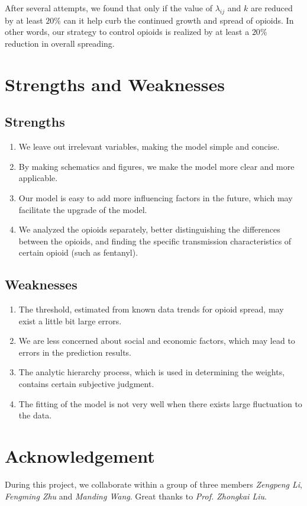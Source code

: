 \documentclass[12pt]{article}
\begin{document}
After several attempts, we found that only if the value of $\lambda_{ij}$ and $k$ are reduced by at least $20\%$ can it help curb the continued growth and spread of opioids. In other words, our strategy to control opioids is realized by at least a $20\%$ reduction in overall spreading.

\section{Strengths and Weaknesses}
\subsection{Strengths}
 \begin{enumerate}[\bfseries (1)]
    \item We leave out irrelevant variables, making the model simple and concise.
    \item By making schematics and figures, we make the model more clear and more applicable.
    \item Our model is easy to add more influencing factors in the future, which may facilitate the upgrade of the model.
    \item We analyzed the opioids separately, better distinguishing the differences between the opioids, and finding the specific transmission characteristics of certain opioid (such as fentanyl).
 \end{enumerate}

\subsection{Weaknesses}
\begin{enumerate}[\bfseries (1)]
\item The threshold, estimated from known data trends for opioid spread, may exist a little bit large errors.
\item We are less concerned about social and economic factors, which may lead to errors in the prediction results.
\item The analytic hierarchy process, which is used in determining the weights, contains certain subjective judgment.
\item The fitting of the model is not very well when there exists large fluctuation to the data.
\end{enumerate}

\section*{Acknowledgement}
During this project, we collaborate within a group of three members \textit{Zengpeng Li}, \textit{Fengming Zhu} and \textit{Manding Wang}. Great thanks to \textit{Prof. Zhongkai Liu}.
\end{document}
